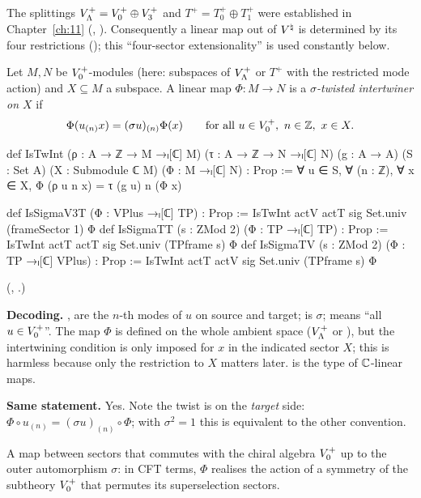 The splittings $V_{\Lambda}^+=V_0^{+}\oplus V_3^{+}$ and $T^+=T_0^+\oplus T_1^+$ were established in
Chapter~\ref{ch:11} (, ).  Consequently a linear map
out of ${V^{\natural}}$ is determined by its four restrictions (); this ``four-sector
extensionality'' is used constantly below.

\begin{definition}\label{ch14:def:twint}
Let $M,N$ be $V_0^{+}$-modules (here: subspaces of $V_{\Lambda}^+$ or $T^+$ with the restricted mode
action) and $X\subseteq M$ a subspace.  A linear map $\Phi:M\to N$ is a \emph{$\sigma$-twisted
intertwiner on $X$} if
\begin{equation*}
  \Phi(u_{(n)}x)=(\sigma u)_{(n)}\Phi(x)\qquad\text{for all }u\in V_0^{+},\ n\in{\mathbb{Z}},\ x\in X.
\end{equation*}
\end{definition}
\begin{leancode}
def IsTwInt (ρ : A → ℤ → M →ₗ[ℂ] M) (τ : A → ℤ → N →ₗ[ℂ] N) (g : A → A) (S : Set A)
    (X : Submodule ℂ M) (Φ : M →ₗ[ℂ] N) : Prop :=
  ∀ u ∈ S, ∀ (n : ℤ), ∀ x ∈ X, Φ (ρ u n x) = τ (g u) n (Φ x)

def IsSigmaV3T (Φ : VPlus →ₗ[ℂ] TP) : Prop :=
  IsTwInt actV actT sig Set.univ (frameSector 1) Φ
def IsSigmaTT (s : ZMod 2) (Φ : TP →ₗ[ℂ] TP) : Prop :=
  IsTwInt actT actT sig Set.univ (TPframe s) Φ
def IsSigmaTV (s : ZMod 2) (Φ : TP →ₗ[ℂ] VPlus) : Prop :=
  IsTwInt actT actV sig Set.univ (TPframe s) Φ
\end{leancode}
(, .)

\begin{dictionary}
\textbf{Decoding.}  ,  are the $n$-th modes of $u$ on source and target;
 is $\sigma$;  means ``all $u\in V_0^{+}$''.  The map $\Phi$ is defined
on the whole ambient space ($V_{\Lambda}^+$ or ), but the intertwining condition is only
imposed for $x$ in the indicated sector $X$; this is harmless because only the restriction to $X$
matters later.   is the type of ${\mathbb{C}}$-linear maps.

\textbf{Same statement.}  Yes.  Note the twist is on the \emph{target} side:
$\Phi\circ u_{(n)}=(\sigma u)_{(n)}\circ\Phi$; with $\sigma^2=1$ this is equivalent to the other
convention.
\end{dictionary}
\begin{physics}
A map between sectors that commutes with the chiral algebra $V_0^{+}$ up to the outer automorphism $\sigma$: in CFT terms, $\Phi$ realises the action of a symmetry of the subtheory $V_0^{+}$ that permutes its superselection sectors.
\end{physics}


